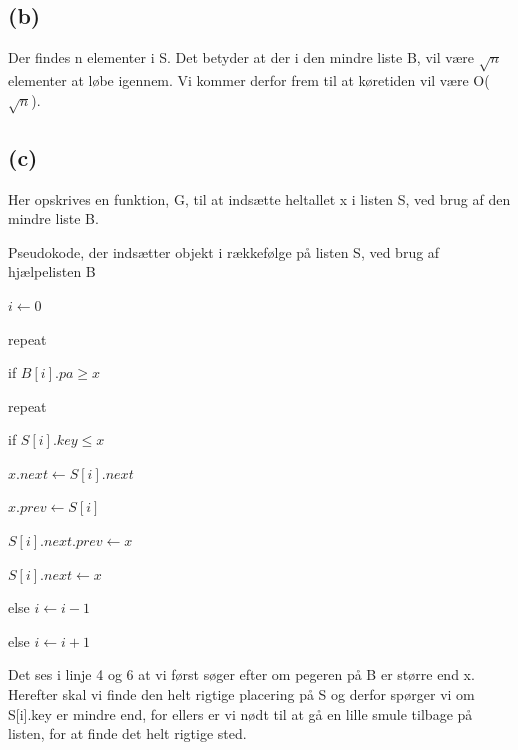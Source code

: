 \documentclass[a4paper,10pt]{article}
\begin{document}
\subsection*{(b)}
Der findes n elementer i S. Det betyder at der i den mindre liste B, vil være $\sqrt{n}$ elementer at løbe igennem. Vi kommer derfor frem til at køretiden vil være O($\sqrt{n}$). \pagebreak 
\subsection*{(c)}
Her opskrives en funktion, G, til at indsætte heltallet x i listen S, ved brug af den mindre liste B. 

\begin{algorithm}[H]
\caption{Pseudokode, der indsætter objekt i rækkefølge på listen S, ved brug af hjælpelisten B}
\begin{algorithmic}[2]
\State \parbox[t]{.7\linewidth}{$i \gets 0$}
\State \parbox[t]{.7\linewidth}{repeat}
\State \parbox[t]{.7\linewidth}{if $B[i].pa \geq x$}
\Indent
\State \parbox[t]{.7\linewidth}{repeat}
\State \parbox[t]{.7\linewidth}{if $S[i].key \leq x$}
\Indent
\State \parbox[t]{.7\linewidth}{$x.next \gets S[i].next $}
\State \parbox[t]{.7\linewidth}{$x.prev \gets S[i] $}
\State \parbox[t]{.7\linewidth}{$S[i].next.prev \gets x $}
\State \parbox[t]{.7\linewidth}{$S[i].next \gets x $}
\State {}
\EndIndent
\State \parbox[t]{.7\linewidth}{else $i \gets i-1$}
\EndIndent
\State \parbox[t]{.7\linewidth}{else $i \gets i+1$}
\EndFunction
\end{algorithmic}
\end{algorithm}
Det ses i linje 4 og 6 at vi først søger efter om pegeren på B er større end x. Herefter skal vi finde den helt rigtige placering på S og derfor spørger vi om S[i].key er mindre end, for ellers er vi nødt til at gå en lille smule tilbage på listen, for at finde det helt rigtige sted.
\end{document}
